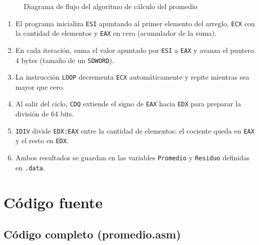 \documentclass[12pt, letterpaper]{article}
\begin{document}
\begin{figure}[H]
{%
    }
    \caption{Diagrama de flujo del algoritmo de cálculo del promedio}
\end{figure}

\begin{enumerate}
    \item El programa inicializa \texttt{ESI} apuntando al primer elemento del arreglo, \texttt{ECX} con la cantidad de elementos y \texttt{EAX} en cero (acumulador de la suma).
    \item En cada iteración, suma el valor apuntado por \texttt{ESI} a \texttt{EAX} y avanza el puntero 4 bytes (tamaño de un \texttt{SDWORD}).
    \item La instrucción \texttt{LOOP} decrementa \texttt{ECX} automáticamente y repite mientras sea mayor que cero.
    \item Al salir del ciclo, \texttt{CDQ} extiende el signo de \texttt{EAX} hacia \texttt{EDX} para preparar la división de 64 bits.
    \item \texttt{IDIV} divide \texttt{EDX:EAX} entre la cantidad de elementos; el cociente queda en \texttt{EAX} y el resto en \texttt{EDX}.
    \item Ambos resultados se guardan en las variables \texttt{Promedio} y \texttt{Residuo} definidas en \texttt{.data}.
\end{enumerate}

\section{Código fuente}

\subsection{Código completo (promedio.asm)}
\end{document}
